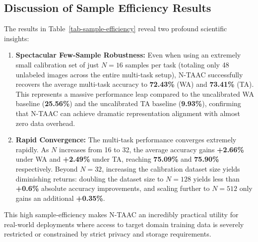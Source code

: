 \documentclass{article}
\theoremstyle{plain}
\theoremstyle{definition}
\theoremstyle{remark}
\begin{document}
\subsection{Discussion of Sample Efficiency Results}
The results in Table~\ref{tab-sample-efficiency} reveal two profound scientific insights:
\begin{enumerate}
\item \textbf{Spectacular Few-Sample Robustness:} Even when using an extremely small calibration set of just $N=16$ samples per task (totaling only 48 unlabeled images across the entire multi-task setup), N-TAAC successfully recovers the average multi-task accuracy to \textbf{72.43\%} (WA) and \textbf{73.41\%} (TA). This represents a massive performance leap compared to the uncalibrated WA baseline (\textbf{25.56\%}) and the uncalibrated TA baseline (\textbf{9.93\%}), confirming that N-TAAC can achieve dramatic representation alignment with almost zero data overhead.
\item \textbf{Rapid Convergence:} The multi-task performance converges extremely rapidly. As $N$ increases from 16 to 32, the average accuracy gains \textbf{+2.66\%} under WA and \textbf{+2.49\%} under TA, reaching \textbf{75.09\%} and \textbf{75.90\%} respectively. Beyond $N=32$, increasing the calibration dataset size yields diminishing returns: doubling the dataset size to $N=128$ yields less than \textbf{+0.6\%} absolute accuracy improvements, and scaling further to $N=512$ only gains an additional \textbf{+0.35\%}.
\end{enumerate}
This high sample-efficiency makes N-TAAC an incredibly practical utility for real-world deployments where access to target domain training data is severely restricted or constrained by strict privacy and storage requirements.
\end{document}
